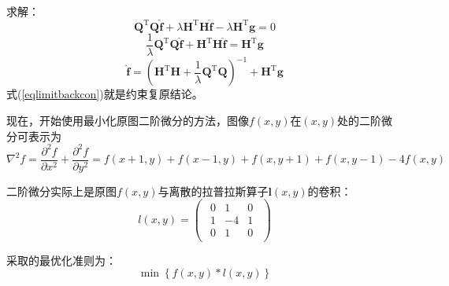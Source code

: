 \documentclass[UTF8]{ctexart}
\begin{document}
    求解：
    \[\pmb{Q}^{\mathrm{T}}\pmb{Q}\hat{\pmb{f}}+\lambda\pmb{H}^{\mathrm{T}}\pmb{H}\hat{\pmb{f}}-\lambda\pmb{H}^{\mathrm{T}}\pmb{g}=0\]
    \[\frac{1}{\lambda}\pmb{Q}^{\mathrm{T}}\pmb{Q}\hat{\pmb{f}}+\pmb{H}^{\mathrm{T}}\pmb{H}\hat{\pmb{f}}=\pmb{H}^{\mathrm{T}}\pmb{g}\]
    \begin{equation}\label{eqlimitbackcon}
        \hat{\pmb{f}}=\left(\pmb{H}^{\mathrm{T}}\pmb{H}+\frac{1}{\lambda}\pmb{Q}^{\mathrm{T}}\pmb{Q}\right)^{-1}+\pmb{H}^{\mathrm{T}}\pmb{g}
    \end{equation}
    式(\ref{eqlimitbackcon})就是约束复原结论。

    现在，开始使用最小化原图二阶微分的方法，图像$f(x,y)$在$(x,y)$处的二阶微分可表示为
    \begin{equation}
        \nabla^2 f=\frac{\partial^2 f}{\partial x^2}+\frac{\partial^2 f}{\partial y^2}=f(x+1,y)+f(x-1,y)+f(x,y+1)+f(x,y-1)-4f(x,y)
    \end{equation}

    二阶微分实际上是原图$f(x,y)$与离散的拉普拉斯算子$\pmb{l}(x,y)$的卷积：
    \begin{equation}
        l(x,y)=\left(\begin{array}{ccc}
            \begin{matrix}
                0 & 1 & 0\\1 & -4 &1\\0 & 1 & 0
            \end{matrix}
        \end{array}\right)
    \end{equation}

    采取的最优化准则为：
    \begin{equation}
        \min\left\{f(x,y)*l(x,y)\right\}
    \end{equation}
\end{document}
